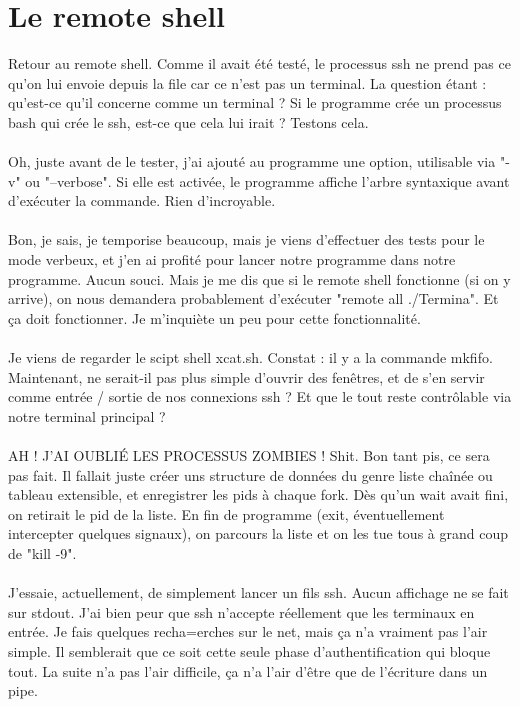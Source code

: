 \chapter[Remote shell]{Le remote shell}
Retour au remote shell. Comme il avait été testé, le processus ssh ne prend pas ce qu'on lui envoie depuis la file car ce n'est pas un terminal. La question étant : qu'est-ce qu'il concerne comme un terminal ? Si le programme crée un processus bash qui crée le ssh, est-ce que cela lui irait ? Testons cela.
\\\\
Oh, juste avant de le tester, j'ai ajouté au programme une option, utilisable via "-v" ou "--verbose". Si elle est activée, le programme affiche l'arbre syntaxique avant d'exécuter la commande. Rien d'incroyable.
\\\\
Bon, je sais, je temporise beaucoup, mais je viens d'effectuer des tests pour le mode verbeux, et j'en ai profité pour lancer notre programme dans notre programme. Aucun souci. Mais je me dis que si le remote shell fonctionne (si on y arrive), on nous demandera probablement d'exécuter "remote all ./Termina". Et ça doit fonctionner. Je m'inquiète un peu pour cette fonctionnalité.
\\\\
Je viens de regarder le scipt shell xcat.sh. Constat : il y a la commande mkfifo. Maintenant, ne serait-il pas plus simple d'ouvrir des fenêtres, et de s'en servir comme entrée / sortie de nos connexions ssh ? Et que le tout reste contrôlable via notre terminal principal ?
\\\\
AH ! J'AI OUBLIÉ LES PROCESSUS ZOMBIES ! Shit. Bon tant pis, ce sera pas fait. Il fallait juste créer uns structure de données du genre liste chaînée ou tableau extensible, et enregistrer les pids à chaque fork. Dès qu'un wait avait fini, on retirait le pid de la liste. En fin de programme (exit, éventuellement intercepter quelques signaux), on parcours la liste et on les tue tous à grand coup de "kill -9".
\\\\
J'essaie, actuellement, de simplement lancer un fils ssh. Aucun affichage ne se fait sur stdout. J'ai bien peur que ssh n'accepte réellement que les terminaux en entrée. Je fais quelques recha=erches sur le net, mais ça n'a vraiment pas l'air simple. Il semblerait que ce soit cette seule phase d'authentification qui bloque tout. La suite n'a pas l'air difficile, ça n'a l'air d'être que de l'écriture dans un pipe.
